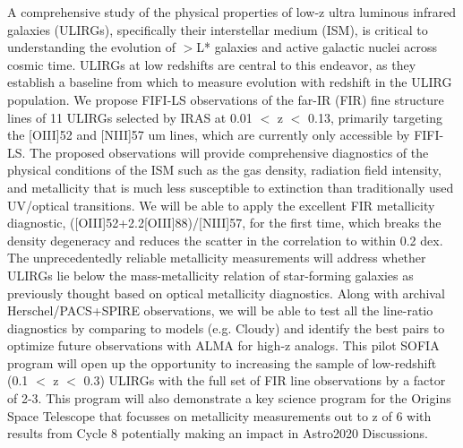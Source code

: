 \documentclass[10pt]{article}
\begin{document}
A comprehensive study of the physical properties of low-z ultra luminous infrared galaxies (ULIRGs), specifically their interstellar medium (ISM), is critical to understanding the evolution of $>$L* galaxies and active galactic nuclei across cosmic time. ULIRGs at low redshifts are central to this endeavor, as they establish a baseline from which to measure evolution with redshift in the ULIRG population. We propose FIFI-LS observations of the far-IR (FIR) fine structure lines of 11 ULIRGs selected by IRAS at 0.01 $<$ z $<$ 0.13, primarily targeting the [OIII]52 and [NIII]57 um lines, which are currently only accessible by FIFI-LS. The proposed observations will provide comprehensive diagnostics of the physical conditions of the ISM such as the gas density, radiation field intensity, and metallicity that is much less susceptible to extinction than traditionally used UV/optical transitions. We will be able to apply the excellent FIR metallicity diagnostic, ([OIII]52+2.2[OIII]88)/[NIII]57, for the first time, which breaks the density degeneracy and reduces the scatter in the correlation to within 0.2 dex. The unprecedentedly reliable metallicity measurements will address whether ULIRGs lie below the mass-metallicity relation of star-forming galaxies as previously thought based on optical metallicity diagnostics. Along with archival Herschel/PACS+SPIRE observations, we will be able to test all the line-ratio diagnostics by comparing to models (e.g. Cloudy) and identify the best pairs to optimize future observations with ALMA for high-z analogs. This pilot SOFIA program will open up the opportunity to increasing the sample of low-redshift (0.1 $<$ z $<$ 0.3) ULIRGs with the full set of FIR line observations by a factor of 2-3. This program will also demonstrate a key science program for the Origins Space Telescope that focusses on metallicity measurements out to z of 6 with results from Cycle 8 potentially making an impact in Astro2020 Discussions.
\end{document}
